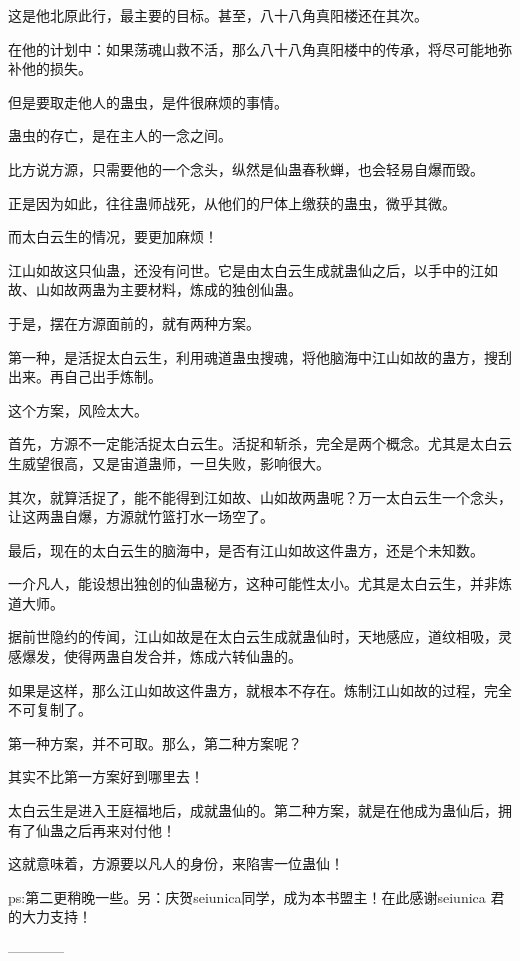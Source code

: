 \begin{this_body}
这是他北原此行，最主要的目标。甚至，八十八角真阳楼还在其次。

在他的计划中：如果荡魂山救不活，那么八十八角真阳楼中的传承，将尽可能地弥补他的损失。

但是要取走他人的蛊虫，是件很麻烦的事情。

蛊虫的存亡，是在主人的一念之间。

比方说方源，只需要他的一个念头，纵然是仙蛊春秋蝉，也会轻易自爆而毁。

正是因为如此，往往蛊师战死，从他们的尸体上缴获的蛊虫，微乎其微。

而太白云生的情况，要更加麻烦！

江山如故这只仙蛊，还没有问世。它是由太白云生成就蛊仙之后，以手中的江如故、山如故两蛊为主要材料，炼成的独创仙蛊。

于是，摆在方源面前的，就有两种方案。

第一种，是活捉太白云生，利用魂道蛊虫搜魂，将他脑海中江山如故的蛊方，搜刮出来。再自己出手炼制。

这个方案，风险太大。

首先，方源不一定能活捉太白云生。活捉和斩杀，完全是两个概念。尤其是太白云生威望很高，又是宙道蛊师，一旦失败，影响很大。

其次，就算活捉了，能不能得到江如故、山如故两蛊呢？万一太白云生一个念头，让这两蛊自爆，方源就竹篮打水一场空了。

最后，现在的太白云生的脑海中，是否有江山如故这件蛊方，还是个未知数。

一介凡人，能设想出独创的仙蛊秘方，这种可能性太小。尤其是太白云生，并非炼道大师。

据前世隐约的传闻，江山如故是在太白云生成就蛊仙时，天地感应，道纹相吸，灵感爆发，使得两蛊自发合并，炼成六转仙蛊的。

如果是这样，那么江山如故这件蛊方，就根本不存在。炼制江山如故的过程，完全不可复制了。

第一种方案，并不可取。那么，第二种方案呢？

其实不比第一方案好到哪里去！

太白云生是进入王庭福地后，成就蛊仙的。第二种方案，就是在他成为蛊仙后，拥有了仙蛊之后再来对付他！

这就意味着，方源要以凡人的身份，来陷害一位蛊仙！

ps:第二更稍晚一些。另：庆贺seiunica同学，成为本书盟主！在此感谢seiunica 君的大力支持！

------------

\end{this_body}

